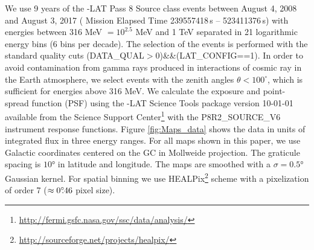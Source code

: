 We use 9 years of the \Fermi-LAT Pass 8 Source class events
between August 4, 2008  and August 3, 2017 ({\Fermi} Mission Elapsed Time 239557418\,s -- 523411376\,s)
with energies between 316 MeV $ = 10^{2.5}$ MeV
and 1 TeV separated in 21 logarithmic energy bins (6 bins per decade).
The selection of the events is performed with the standard quality cuts (DATA\_QUAL$>$0)\&\&(LAT\_CONFIG==1).
In order to avoid contamination from gamma rays produced in interactions of cosmic ray in the Earth atmosphere, 
we select events with the zenith angles $\theta < 100^{\circ}$,
which is sufficient for energies above 316 MeV.
We calculate the exposure and point-spread function (PSF) using the {\Fermi}-LAT Science Tools package version 
10-01-01 available from the {\Fermi} Science Support Center\footnote{\url{http://fermi.gsfc.nasa.gov/ssc/data/analysis/}} 
with the P8R2\_SOURCE\_V6 instrument response functions.
Figure \ref{fig:Maps_data} shows the data in units of integrated flux in three energy ranges. For all maps shown in this paper, we use Galactic coordinates centered on the GC in Mollweide projection. The graticule spacing is $\ang{10}$ in latitude and longitude. The maps are smoothed with a $\sigma = \ang{0.5}$ Gaussian kernel.
For spatial binning we use HEALPix\footnote{\url{http://sourceforge.net/projects/healpix/}} \citep{2005ApJ...622..759G} scheme with a pixelization of order 7  ($\approx 0^\circ\!\!.46$ pixel size). 

